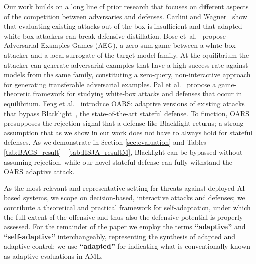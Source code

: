 Our work builds on a long line of prior research that focuses on different aspects of the competition between adversaries and defenses.
Carlini and Wagner~\cite{carlini2017towards} show that evaluating existing attacks out-of-the-box is insufficient and that adapted white-box attackers can break defensive distillation.
Bose et~al.~\cite{bose2020adversarial} propose Adversarial Examples Games (AEG), a zero-sum game between a white-box attacker and a local surrogate of the target model family.
At the equilibrium the attacker can generate adversarial examples that have a high success rate against models from the same family, constituting a zero-query, non-interactive approach for generating transferable adversarial examples.
Pal et al.~\cite{pal2020game} propose a game-theoretic framework for studying white-box attacks and defenses that occur in equilibrium.
Feng et al.~\cite{feng2023stateful} introduce OARS: adaptive versions of existing attacks that bypass Blacklight~\cite{li2022blacklight}, the state-of-the-art stateful defense.
To function, OARS presupposes the rejection signal that a defense like Blacklight returns; a strong assumption that as we show in our work does not have to always hold for stateful defenses.
As we demonstrate in Section \ref{sec:evaluation} and Tables \ref{tab:BAGS_result} - \ref{tab:HSJA_resultM}, Blacklight can be bypassed without assuming rejection, while our novel stateful defense can fully withstand the OARS adaptive attack.

As the most relevant and representative setting for threats against deployed AI-based systems, we scope on decision-based, interactive attacks and defenses; we contribute a theoretical and practical framework for self-adaptation, under which the full extent of the offensive and thus also the defensive potential is properly assessed.
For the remainder of the paper we employ the terms \textbf{``adaptive''} and \textbf{``self-adaptive''} interchangeably, representing the synthesis of adapted and adaptive control; we use \textbf{``adapted''} for indicating what is conventionally known as adaptive evaluations in \gls{AML}.

